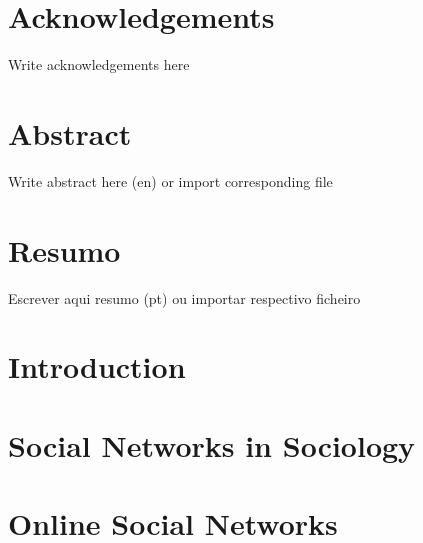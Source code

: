 \documentclass[
  oneside,
  11pt, a4paper,
  footinclude=true,
  headinclude=true,
  cleardoublepage=empty
]{scrbook}
\author{Jorge Caldas}
\date{\myear}
\begin{document}
	\umfrontcover
	\umtitlepage
	
	\chapter*{Acknowledgements}
	Write acknowledgements here

	\chapter*{Abstract}
	Write abstract here (en) or import corresponding file
	
	\cleardoublepage
	\chapter*{Resumo}
	Escrever aqui resumo (pt) ou importar respectivo ficheiro
	
	\tableofcontents
	
	
	\listoffigures
	\listoftables
	\printglossary[type=\acronymtype]
	\clearpage
	\thispagestyle{empty}
	
	
	\chapter{Introduction}
	
	
	
	\chapter{Social Networks in Sociology}
	
	
	
	\chapter{Online Social Networks}
	
	
	
\end{document}
